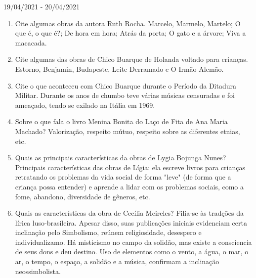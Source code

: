\documentclass{SchoolBook}
\begin{document}
\begin{day}{19/04/2021 - 20/04/2021}
\begin{enumerate}
            \item Cite algumas obras da autora Ruth Rocha.
            \response Marcelo, Marmelo, Martelo; O que é, o que é?; De hora em hora; Atrás da porta; O gato e a árvore; Viva a macacada.

            \item Cite algumas das obras de Chico Buarque de Holanda voltado para crianças.
            \response Estorno, Benjamin, Budapeste, Leite Derramado e O Irmão Alemão.

            \item Cite o que aconteceu com Chico Buarque durante o Período da Ditadura Militar.
            \response Durante os anos de chumbo teve várias músicas censuradas e foi ameaçado, tendo se exilado na Itália em 1969.

            \item Sobre o que fala o livro Menina Bonita do Laço de Fita de Ana Maria Machado?
            \response Valorização, respeito mútuo, respeito sobre as diferentes etnias, etc.

            \item Quais as principais características da obras de Lygia Bojunga Nunes?
            \response Principais características das obras de Lígia: ela escreve livros para crianças retratando os problemas da vida social de forma "leve" (de forma que a criança possa entender) e aprende a lidar com os problemas sociais, como a fome, abandono, diversidade de gêneros, etc.

            \item Quais as características da obra de Cecília Meireles?
            \response Filia-se às tradções da lírica luso-brasileira. Apesar disso, suas publicações iniciais evidenciam certa inclinação pelo Simbolismo, reúnem religiosidade, desespero e individualizamo. Há misticismo no campo da solidão, mas existe a consciencia de seus dons e deu destino. Uso de elementos como o vento, a água, o mar, o ar, o tempo, o espaço, a solidão e a música, confirmam a inclinação neossimbolista.
        \end{enumerate}
    \end{day}
    
\end{document}
